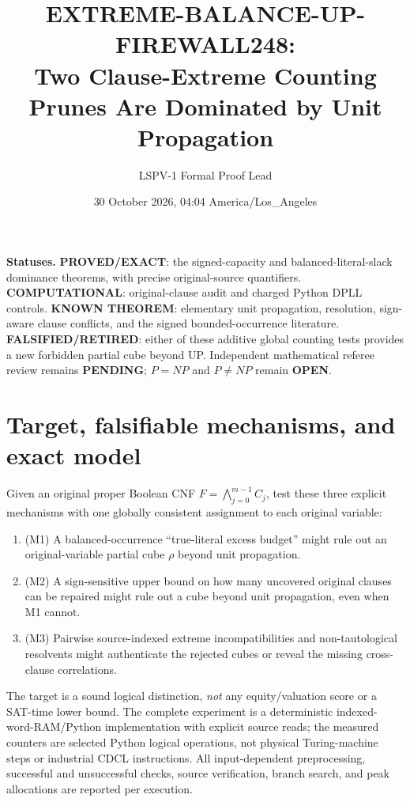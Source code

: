 \documentclass[10pt]{article}
\title{EXTREME-BALANCE-UP-FIREWALL248:\\Two Clause-Extreme Counting Prunes Are Dominated by Unit Propagation}
\author{LSPV-1 Formal Proof Lead}
\date{30 October 2026, 04:04 America/Los\_Angeles}
\begin{document}
\maketitle
\noindent\textbf{Statuses.} \textbf{PROVED/EXACT}: the signed-capacity and balanced-literal-slack dominance theorems, with precise original-source quantifiers. \textbf{COMPUTATIONAL}: original-clause audit and charged Python DPLL controls. \textbf{KNOWN THEOREM}: elementary unit propagation, resolution, sign-aware clause conflicts, and the signed bounded-occurrence literature. \textbf{FALSIFIED/RETIRED}: either of these additive global counting tests provides a new forbidden partial cube beyond UP. Independent mathematical referee review remains \textbf{PENDING}; $P=NP$ and $P\ne NP$ remain \textbf{OPEN}.

\section{Target, falsifiable mechanisms, and exact model}
Given an original proper Boolean CNF $F=\bigwedge_{j=0}^{m-1} C_j$, test these three explicit mechanisms with one globally consistent assignment to each original variable:
\begin{enumerate}
\item[] (M1) A balanced-occurrence ``true-literal excess budget'' might rule out an original-variable partial cube $\rho$ beyond unit propagation.
\item[] (M2) A sign-sensitive upper bound on how many uncovered original clauses can be repaired might rule out a cube beyond unit propagation, even when M1 cannot.
\item[] (M3) Pairwise source-indexed extreme incompatibilities and non-tautological resolvents might authenticate the rejected cubes or reveal the missing cross-clause correlations.
\end{enumerate}
The target is a sound logical distinction, \emph{not} any equity/valuation score or a SAT-time lower bound. The complete experiment is a deterministic indexed-word-RAM/Python implementation with explicit source reads; the measured counters are selected Python logical operations, not physical Turing-machine steps or industrial CDCL instructions. All input-dependent preprocessing, successful and unsuccessful checks, source verification, branch search, and peak allocations are reported per execution.
\end{document}
